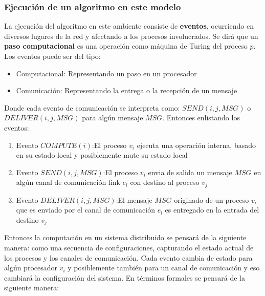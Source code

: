\documentclass[10pt]{report}
\begin{document}
    \subsubsection{Ejecución de un algoritmo en este modelo}
    \newline
    La ejecución del algoritmo en este ambiente consiste de \textbf{eventos}, ocurriendo en diversos
    lugares de la red y afectando a los procesos involucrados.
    Se dirá que un \textbf{paso computacional} es una operación como máquina de Turing del proceso $p$.
    Los eventos puede ser del tipo:
    \begin{itemize}
        \item Computacional: Representando un paso en un procesador
        \item Comunicación: Representando la entrega o la recepción de un mensaje
    \end{itemize}
    Donde cada evento de comunicación se interpreta como:\newline
    $SEND(i,j,MSG)$ o $DELIVER(i,j,MSG)$ para algún mensaje $MSG$.
    Entonces enlistando los eventos:
    \begin{enumerate}
        \item Evento $COMPUTE(i)$:\space El proceso $v_{i}$ ejecuta una operación interna, basado en su estado local y
        posiblemente mute su estado local
        \item Evento $SEND(i,j,MSG)$:\space El proceso $v_{i}$ envia de salida un mensaje $MSG$ en algún canal de
        comunicación link $e_{l}$ con destino al proceso $v_{j}$
        \item Evento $DELIVER(i,j,MSG)$:\space El mensaje $MSG $ originado de un proceso $v_{i}$
        que es enviado por el canal de comunicación $e_{l}$ es entregado en la entrada del destino $v_{j}$
    \end{enumerate}
    Entonces la computación en un sistema distribuido se pensará de la siguiente manera: \newline
    como una secuencia de configuraciones, capturando el estado actual de los procesos y los canales de comunicación.\newline
    Cada evento cambia de estado para algún procesador $v_{i}$ y posiblemente también para un canal de comunicación
    y eso cambiará la configuración del sistema.
    En términos formales se pensará de la siguiente manera:
    \theoremstyle{definition}
\end{document}

